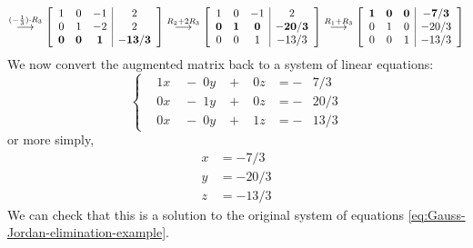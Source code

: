 \documentclass[10pt]{article}
\newenvironment{augmentedmatrix}[1] %
{\left[\begin{array}{#1}}
    {\end{array}\right]}
\theoremstyle{definition}
\begin{document}
\begin{equation*}
  \overset{(-\frac{1}{3})\cdot R_{3}}{\longrightarrow}
  \begin{augmentedmatrix}{ccc|c}
    1& 0& -1& 2 \\
    0& 1& -2& 2 \\
    \mathbf{0}& \mathbf{0}& \mathbf{1}& \mathbf{-13/3}
  \end{augmentedmatrix}
  \overset{R_{2}+2R_{3}}{\longrightarrow}
  \begin{augmentedmatrix}{ccc|c}
    1& 0& -1& 2 \\
    \mathbf{0}& \mathbf{1}& \mathbf{0}& \mathbf{-20/3} \\
    0& 0& 1& -13/3
  \end{augmentedmatrix}
  \overset{R_{1}+R_{3}}{\longrightarrow}
  \begin{augmentedmatrix}{ccc|c}
    \mathbf{1}& \mathbf{0}& \mathbf{0}& \mathbf{-7/3} \\
    0& 1& 0& -20/3 \\
    0& 0& 1& -13/3
  \end{augmentedmatrix}
\end{equation*}
We now convert the augmented matrix back to a system of linear equations:
\begin{equation*}
  \left\{
    \begin{alignedat}{4}
      &1x &{}\;-\; 0y &{}\;+\; &0z{}&= -&7/3 \\
      &0x&{}\;-\; 1y&{}\;+\; &0z{}&= -&20/3 \\
      &0x&{}\;-\; 0y&{}\;+\; &1z {}&= -&13/3
    \end{alignedat}
  \right.
\end{equation*}
or more simply,
\begin{align*}
  x &= -7/3\\
  y &= -20/3\\
  z &= -13/3
\end{align*}
We can check that this is a solution to the original system of equations \eqref{eq:Gauss-Jordan-elimination-example}.
\end{document}
